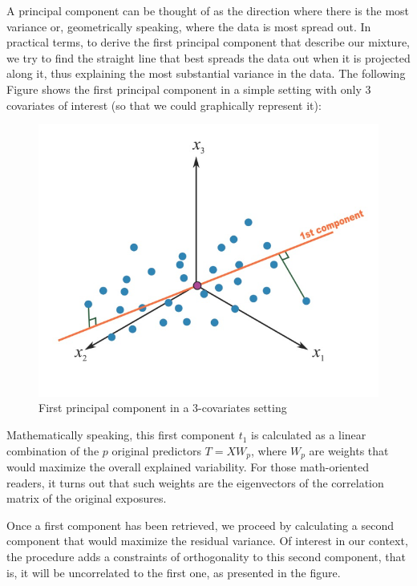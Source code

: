\documentclass[
]{book}
\begin{document}
A principal component can be thought of as the direction where there is the most variance or, geometrically speaking, where the data is most spread out. In practical terms, to derive the first principal component that describe our mixture, we try to find the straight line that best spreads the data out when it is projected along it, thus explaining the most substantial variance in the data. The following Figure shows the first principal component in a simple setting with only 3 covariates of interest (so that we could graphically represent it):

\begin{figure}
\centering
\includegraphics{images/pca1.png}
\caption{First principal component in a 3-covariates setting}
\end{figure}

Mathematically speaking, this first component \(t_1\) is calculated as a linear combination of the \(p\) original predictors \(T=XW_p\), where \(W_p\) are weights that would maximize the overall explained variability. For those math-oriented readers, it turns out that such weights are the eigenvectors of the correlation matrix of the original exposures.

Once a first component has been retrieved, we proceed by calculating a second component that would maximize the residual variance. Of interest in our context, the procedure adds a constraints of orthogonality to this second component, that is, it will be uncorrelated to the first one, as presented in the figure.
\end{document}
